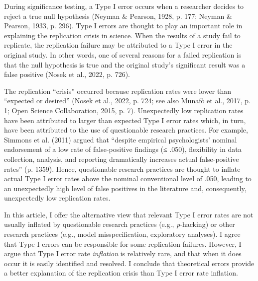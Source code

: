 \documentclass[authordate, meta]{jote-new-article}
\author[1]{\mbox{Mark Rubin\orcid{0000-0002-6483-8561}}}
\affil[1]{Durham University}
\begin{document}
\begin{frontmatter}
  \maketitle
  
  \begin{abstract}
    \printabstracttext


	
  \end{abstract}
  
\end{frontmatter}










	During significance testing, a Type I error occurs when a researcher decides to reject a true null hypothesis (Neyman \& Pearson, 1928, p. 177; Neyman \& Pearson, 1933, p. 296). Type I errors are thought to play an important role in explaining the replication crisis in science. When the results of a study fail to replicate, the replication failure may be attributed to a Type I error in the original study. In other words, one of several reasons for a failed replication is that the null hypothesis is true and the original study's significant result was a false positive (Nosek et al., 2022, p. 726).



	The replication “crisis” occurred because replication rates were lower than “expected or desired” (Nosek et al., 2022, p. 724; see also Munafò et al., 2017, p. 1; Open Science Collaboration, 2015, p. 7). Unexpectedly low replication rates have been attributed to larger than expected Type I error rates which, in turn, have been attributed to the use of questionable research practices. For example, Simmons et al. (2011) argued that “despite empirical psychologists' nominal endorsement of a low rate of false-positive findings (≤ .050), flexibility in data collection, analysis, and reporting dramatically increases actual false-positive rates” (p. 1359). Hence, questionable research practices are thought to inflate actual Type I error rates above the nominal conventional level of .050, leading to an unexpectedly high level of false positives in the literature and, consequently, unexpectedly low replication rates.



	In this article, I offer the alternative view that relevant Type I error rates are not usually inflated by questionable research practices (e.g., \emph{p}-hacking) or other research practices (e.g., model misspecification, exploratory analyses). I agree that Type I errors can be responsible for some replication failures. However, I argue that Type I error rate \emph{inflation} is relatively rare, and that when it does occur it is easily identified and resolved. I conclude that theoretical errors provide a better explanation of the replication crisis than Type I error rate inflation.
\end{document}

